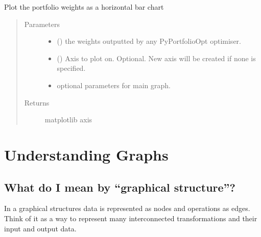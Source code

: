 \documentclass[letterpaper,10pt,english]{sphinxmanual}
\begin{document}
\begin{fulllineitems}
\label{\detokenize{dalio.util:dalio.util.plot_weights}}
Plot the portfolio weights as a horizontal bar chart
\begin{quote}\begin{description}
\item[{Parameters}] \leavevmode\begin{itemize}
\item {} 
 () \textendash{} the weights outputted by any PyPortfolioOpt
optimiser.

\item {} 
 (\sphinxstyleliteralemphasis{\sphinxupquote{, }}) \textendash{} Axis to plot on. Optional. New axis will
be created if none is specified.

\item {} 
 \textendash{} optional parameters for main graph.

\end{itemize}

\item[{Returns}] \leavevmode
matplotlib axis

\end{description}\end{quote}

\end{fulllineitems}



\section{Understanding Graphs}
\label{\detokenize{beginners-guide:understanding-graphs}}\label{\detokenize{beginners-guide:beginners-guide}}\label{\detokenize{beginners-guide::doc}}

\subsection{What do I mean by “graphical structure”?}
\label{\detokenize{beginners-guide:what-do-i-mean-by-graphical-structure}}
In a graphical structures data is represented as nodes and operations as edges. Think of it as a way to represent many inter\sphinxhyphen{}connected transformations and their input and output data.
\end{document}
